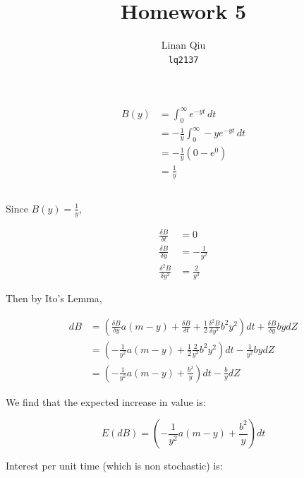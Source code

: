 \documentclass[11pt]{scrartcl}
\title{Homework 5}
\author{Linan Qiu\\\texttt{lq2137}}
\begin{document}
\maketitle

\section{}

\subsection{}

\begin{align*}
B(y) &= \int_{0}^{\infty} e^{-yt} \, dt \\
&= -\frac{1}{y} \int_0^\infty -ye^{-yt} \, dt \\
&= -\frac{1}{y}\left( 0 - e^0 \right) \\
&= \frac{1}{y}
\end{align*}

\subsection{}

Since $B(y) = \frac{1}{y}$,

\begin{align*}
\frac{\delta B}{\delta t} &= 0 \\
\frac{\delta B}{\delta y} &= -\frac{1}{y^2} \\
\frac{\delta^2 B}{\delta y^2} &= \frac{2}{y^3}
\end{align*}

Then by Ito's Lemma,

\begin{align*}
dB &= \left(\frac{\delta B}{\delta y} a(m-y) + \frac{\delta B}{\delta t} + \frac{1}{2}\frac{\delta^2 B}{\delta y^2}b^2y^2\right)dt + \frac{\delta B}{\delta y} bydZ \\
&= \left(-\frac{1}{y^2}a(m-y) + \frac{1}{2}\frac{2}{y^3} b^2y^2 \right)dt - \frac{1}{y^2}bydZ \\
&= \left(-\frac{1}{y^2}a(m-y) + \frac{b^2}{y} \right)dt - \frac{b}{y} dZ
\end{align*}

We find that the expected increase in value is:

\[E(dB) = \left(-\frac{1}{y^2}a(m-y) + \frac{b^2}{y}\right)dt\]

Interest per unit time (which is non stochastic) is:
\end{document}

